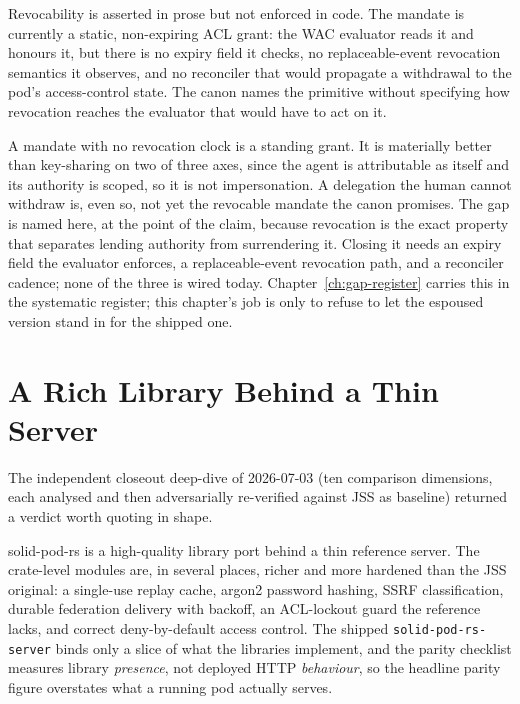 Revocability is asserted in prose but not enforced in code. The mandate is currently a static, non-expiring ACL grant: the WAC evaluator reads it and honours it, but there is no expiry field it checks, no replaceable-event revocation semantics it observes, and no reconciler that would propagate a withdrawal to the pod's access-control state. The canon names the primitive without specifying how revocation reaches the evaluator that would have to act on it.

\begin{cautionbox}[title={Delegation versus impersonation}]
A mandate with no revocation clock is a standing grant. It is materially better than key-sharing on two of three axes, since the agent is attributable as itself and its authority is scoped, so it is not impersonation. A delegation the human cannot withdraw is, even so, not yet the revocable mandate the canon promises. The gap is named here, at the point of the claim, because revocation is the exact property that separates lending authority from surrendering it. Closing it needs an expiry field the evaluator enforces, a replaceable-event revocation path, and a reconciler cadence; none of the three is wired today. Chapter~\ref{ch:gap-register} carries this in the systematic register; this chapter's job is only to refuse to let the espoused version stand in for the shipped one.
\end{cautionbox}

\section{A Rich Library Behind a Thin Server}

The independent closeout deep-dive of 2026-07-03 (ten comparison dimensions, each analysed and then adversarially re-verified against JSS as baseline) returned a verdict worth quoting in shape.

\begin{evidencebox}[title={Library present is not server wired}]
solid-pod-rs is a high-quality library port behind a thin reference server. The crate-level modules are, in several places, richer and more hardened than the JSS original: a single-use replay cache, argon2 password hashing, SSRF classification, durable federation delivery with backoff, an ACL-lockout guard the reference lacks, and correct deny-by-default access control. The shipped \texttt{solid-pod-rs-server} binds only a slice of what the libraries implement, and the parity checklist measures library \emph{presence}, not deployed HTTP \emph{behaviour}, so the headline parity figure overstates what a running pod actually serves.
\end{evidencebox}


